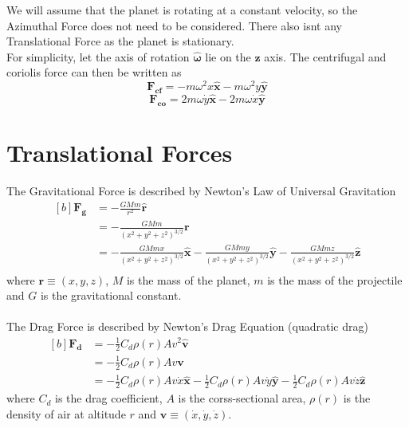 \documentclass[14]{article}
\newcommand{\bs}[1]{\boldsymbol{#1}}
\newcommand{\om}{\omega}
\begin{document}
We will assume that the planet is rotating at a constant velocity, so the Azimuthal Force does not need to be considered. There also isnt any Translational Force as the planet is stationary.\\
For simplicity, let the axis of rotation $\bs{\hat{\om}}$ lie on the $\bs{z}$ axis. The centrifugal and coriolis force can then be written as 
\begin{equation} \bs{F_{cf}} = -m\om^2x\bs{\hat{x}} - m\om^2y\bs{\hat{y}} \end{equation}
\begin{equation} \bs{F_{co}} = 2m\om\dot{y}\bs{\hat{x}} - 2m\om\dot{x}\bs{\hat{y}}\end{equation}

\section{Translational Forces}
The Gravitational Force is described by Newton's Law of Universal Gravitation
\begin{equation}
\begin{aligned}[b]
\bs{F_g} &= -\frac{GMm}{r^2}\bs{\hat{r}}\\
&= -\frac{GMm}{(x^2+y^2+z^2)^{3/2}}\bs{r}\\
&= -\frac{GMmx}{(x^2+y^2+z^2)^{3/2}}\bs{\hat{x}} -\frac{GMmy}{(x^2+y^2+z^2)^{3/2}}\bs{\hat{y}} -\frac{GMmz}{(x^2+y^2+z^2)^{3/2}}\bs{\hat{z}}\\
\end{aligned}
\end{equation}
where $\bs{r} \equiv (x, y, z)$, $M$ is the mass of the planet, $m$ is the mass of the projectile and $G$ is the gravitational constant.\\
\\
The Drag Force is described by Newton's Drag Equation (quadratic drag)
\begin{equation}
\begin{aligned}[b]
\bs{F_d} &= -\frac{1}{2}C_d\rho(r)Av^2\bs{\hat{v}}\\
&= -\frac{1}{2}C_d\rho(r)Av\bs{v}\\
&= -\frac{1}{2}C_d\rho(r)Av\dot{x}\bs{\hat{x}} - \frac{1}{2}C_d\rho(r)Av\dot{y}\bs{\hat{y}} - \frac{1}{2}C_d\rho(r)Av\dot{z}\bs{\hat{z}}
\end{aligned}
\end{equation}
where $C_d$ is the drag coefficient, $A$ is the corss-sectional area, $\rho(r)$ is the density of air at altitude $r$ and $\bs{v} \equiv (\dot{x}, \dot{y}, \dot{z})$.
\end{document}
